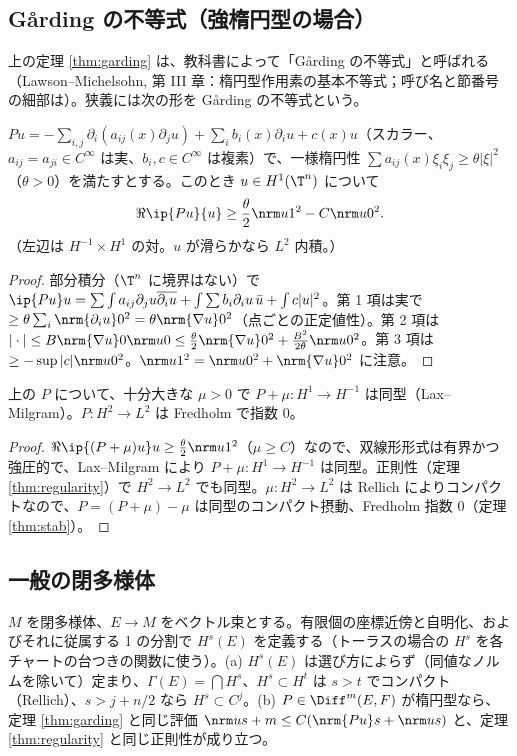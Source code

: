 \subsection{Gårding の不等式（強楕円型の場合）}
上の定理 \ref{thm:garding} は、教科書によって「Gårding の不等式」と呼ばれる（Lawson--Michelsohn, 第 III 章：楕円型作用素の基本不等式；呼び名と節番号の細部は\tQ）。狭義には次の形を Gårding の不等式という。
\begin{thm}\label{thm:garding2}\tP
$P u=-\sum_{i,j}\partial_i(a_{ij}(x)\partial_ju)+\sum_ib_i(x)\partial_iu+c(x)u$（スカラー、$a_{ij}=a_{ji}\in C^\infty$ は実、$b_i,c\in C^\infty$ は複素）で、一様楕円性 $\sum a_{ij}(x)\xi_i\xi_j\ge\theta|\xi|^2$（$\theta>0$）を満たすとする。このとき $u\in H^1(\T^n)$ について
\[
\Re\ip{Pu}{u}\ge\frac\theta2\nrm u1^2-C\nrm u0^2.
\]
（左辺は $H^{-1}\times H^1$ の対。$u$ が滑らかなら $L^2$ 内積。）
\end{thm}
\begin{proof}
部分積分（$\T^n$ に境界はない）で $\ip{Pu}u=\sum\int a_{ij}\partial_ju\overline{\partial_iu}+\int\sum b_i\partial_iu\,\bar u+\int c|u|^2$。第 1 項は実で $\ge\theta\sum_i\nrm{\partial_iu}0^2=\theta\nrm{\nabla u}0^2$（点ごとの正定値性）。第 2 項は $|\cdot|\le B\nrm{\nabla u}0\nrm u0\le\frac\theta2\nrm{\nabla u}0^2+\frac{B^2}{2\theta}\nrm u0^2$。第 3 項は $\ge-\sup|c|\nrm u0^2$。$\nrm u1^2=\nrm u0^2+\nrm{\nabla u}0^2$ に注意。
\end{proof}
\begin{cor}\label{cor:lax}\tP
上の $P$ について、十分大きな $\mu>0$ で $P+\mu:H^1\to H^{-1}$ は同型（Lax--Milgram）。$P:H^2\to L^2$ は Fredholm で指数 $0$。
\end{cor}
\begin{proof}
$\Re\ip{(P+\mu)u}u\ge\frac\theta2\nrm u1^2$（$\mu\ge C$）なので、双線形形式は有界かつ強圧的で、Lax--Milgram により $P+\mu:H^1\to H^{-1}$ は同型。正則性（定理 \ref{thm:regularity}）で $H^2\to L^2$ でも同型。$\mu:H^2\to L^2$ は Rellich によりコンパクトなので、$P=(P+\mu)-\mu$ は同型のコンパクト摂動、Fredholm 指数 $0$（定理 \ref{thm:stab}）。
\end{proof}

\subsection{一般の閉多様体}\label{sec:general}
\begin{prop}\label{prop:generalM}\tC
$M$ を閉多様体、$E\to M$ をベクトル束とする。有限個の座標近傍と自明化、およびそれに従属する 1 の分割で $H^s(E)$ を定義する（トーラスの場合の $H^s$ を各チャートの台つきの関数に使う）。(a) $H^s(E)$ は選び方によらず（同値なノルムを除いて）定まり、$\Gamma(E)=\bigcap H^s$、$H^s\subset H^t$ は $s>t$ でコンパクト（Rellich）、$s>j+n/2$ なら $H^s\subset C^j$。(b) $P\in\Diff^m(E,F)$ が楕円型なら、定理 \ref{thm:garding} と同じ評価 $\nrm u{s+m}\le C(\nrm{Pu}s+\nrm us)$ と、定理 \ref{thm:regularity} と同じ正則性が成り立つ。
\end{prop}
